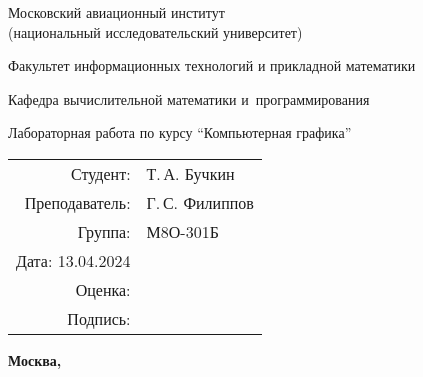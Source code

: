 \begin{titlepage}
\begin{center}
\bfseries

{\Large Московский авиационный институт\\ (национальный исследовательский университет)

}

\vspace{48pt}

{\large Факультет информационных технологий и прикладной математики
}

\vspace{36pt}

{\large Кафедра вычислительной математики и~программирования

}


\vspace{48pt}

Лабораторная работа  по курсу \enquote{Компьютерная графика}

\end{center}

\vspace{72pt}

\begin{flushright}
\begin{tabular}{rl}
Студент: & Т.\,А. Бучкин \\
Преподаватель: & Г.\,С. Филиппов \\
Группа: & М8О-301Б \\
Дата: 13.04.2024& \\
Оценка: & \\
Подпись: & \\
\end{tabular}
\end{flushright}

\vfill

\begin{center}
\bfseries
Москва, \the\year
\end{center}
\end{titlepage}

\pagebreak
